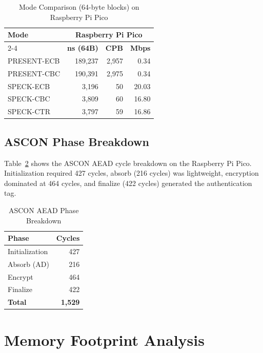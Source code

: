 \documentclass[12pt]{report}
\begin{document}
\begin{table}[H]
    \centering
    \begin{tabular}{lrrr}
        \toprule
        \textbf{Mode} & \multicolumn{3}{c}{\textbf{Raspberry Pi Pico}} \\
        \cmidrule{2-4}
         & \textbf{ns (64B)} & \textbf{CPB} & \textbf{Mbps} \\
        \midrule
        PRESENT-ECB & 189,237 & 2,957 & 0.34 \\
        PRESENT-CBC & 190,391 & 2,975 & 0.34 \\
        SPECK-ECB & 3,196 & 50 & 20.03 \\
        SPECK-CBC & 3,809 & 60 & 16.80 \\
        SPECK-CTR & 3,797 & 59 & 16.86 \\
        \bottomrule
    \end{tabular}
    \caption{Mode Comparison (64-byte blocks) on Raspberry Pi Pico}
    \label{tab:mode-bench-merged}
\end{table}


\subsection{ASCON Phase Breakdown}

Table~\ref{tab:ascon-phases} shows the ASCON AEAD cycle breakdown on the Raspberry Pi Pico.
Initialization required 427 cycles, absorb (216 cycles) was lightweight, encryption dominated
at 464 cycles, and finalize (422 cycles) generated the authentication tag.

\begin{table}[H]
    \centering
    \begin{tabular}{lr}
        \toprule
        \textbf{Phase} & \textbf{Cycles} \\
        \midrule
        Initialization & 427 \\
        Absorb (AD) & 216 \\
        Encrypt & 464 \\
        Finalize & 422 \\
        \midrule
        \textbf{Total} & \textbf{1{,}529} \\
        \bottomrule
    \end{tabular}
    \caption{ASCON AEAD Phase Breakdown}
    \label{tab:ascon-phases}
\end{table}

\section{Memory Footprint Analysis}
\end{document}
